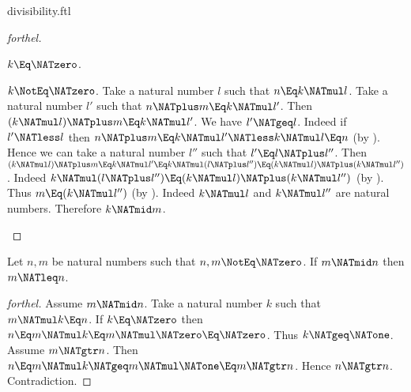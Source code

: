 \documentclass{stex}
\begin{document}
\begin{smodule}{divisibility.ftl}
\begin{proof}[forthel]
  \begin{case}{$k \Eq \NATzero$.} \end{case}

  \begin{case}{$k \NotEq \NATzero$.}
    Take a natural number $l$ such that $n \Eq k \NATmul l$.
    Take a natural number $l'$ such that $n \NATplus m \Eq k \NATmul l'$.
    Then $(k \NATmul l) \NATplus m \Eq k \NATmul l'$.
    We have $l' \NATgeq l$.
    Indeed if $l' \NATless l$ then
    $n \NATplus m
      \Eq k \NATmul l'
      \NATless k \NATmul l
      \Eq n$ (by ).
    Hence we can take a natural number $l''$ such that $l' \Eq l \NATplus l''$.
    Then $(k \NATmul l) \NATplus m
      \Eq k \NATmul l'
      \Eq k \NATmul (l \NATplus l'')
      \Eq (k \NATmul l) \NATplus (k \NATmul l'')$.
    Indeed $k \NATmul (l \NATplus l'') \Eq (k \NATmul l) \NATplus (k \NATmul l'')$ (by ).
    Thus $m \Eq (k \NATmul l'')$ (by ).
    Indeed $k \NATmul l$ and $k \NATmul l''$ are natural numbers.
    Therefore $k \NATmid m$.
  \end{case}
\end{proof}

\begin{proposition}[forthel]
  Let $n, m$ be natural numbers such that $n, m \NotEq \NATzero$.
  If $m \NATmid n$ then $m \NATleq n$.
\end{proposition}
\begin{proof}[forthel]
  Assume $m \NATmid n$.
  Take a natural number $k$ such that $m \NATmul k \Eq n$.
  If $k \Eq \NATzero$ then
  $n
    \Eq m \NATmul k
    \Eq m \NATmul \NATzero
    \Eq \NATzero$.
  Thus $k \NATgeq \NATone$.
  Assume $m \NATgtr n$.
  Then $n
    \Eq m \NATmul k
    \NATgeq m \NATmul \NATone
    \Eq m
    \NATgtr n$.
  Hence $n \NATgtr n$.
  Contradiction.
\end{proof}
\end{smodule}
\end{document}
